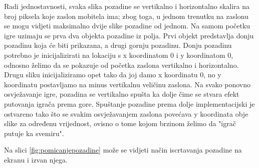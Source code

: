 \documentclass[times, utf8, zavrsni, numeric]{fer}
\begin{document}
	Radi jednostavnosti, svaka slika pozadine se  vertikalno i horizontalno skalira na broj piksela koje zaslon mobitela ima; zbog toga, u jednom trenutku na zaslonu se mogu vidjeti maksimalno dvije slike
	pozadine od jednom. Na samom početku igre uzimaju se prva dva objekta pozadine iz polja. Prvi objekt predstavlja donju pozadinu koja će biti prikazana, a drugi gornju pozadinu.  Donju pozadinu potrebno je inicijalizirati
	na lokaciju s x koordinatom 0 i y koordinatom 0, odnosno želimo da se pokazuje od početka zaslona vertikalno i horizontalno. Drugu sliku inicijaliziramo opet tako da joj damo x koordinatu 0, no y koordinatu postavljamo
	na minus vertikalnu veličinu zaslona. Na svako ponovno osvježavanje igre, pozadina se vertikalno spušta ka dolje čime se stvara efekt putovanja igrača prema gore. Spuštanje pozadine prema dolje implementacijski je 
	ostvareno tako što se svakim osvježavanjem zaslona povećava y koordinata obje slike za određenu vrijednost, ovisno o tome kojom brzinom želimo da "igrač putuje ka svemiru". 
	
	Na slici \ref{fig:pomicanjepozadine} može se vidjeti način iscrtavanja pozadine na ekranu i izvan njega.
	
\end{document}
